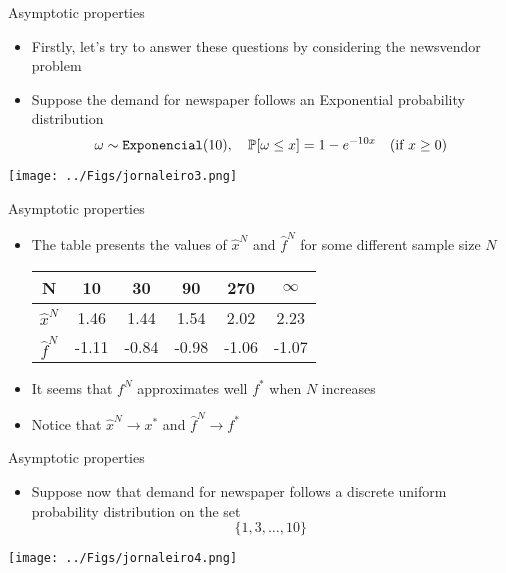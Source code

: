  
 
\begin{frame}{Asymptotic properties}
\begin{itemize}
\item Firstly, let's try to answer these questions by considering the newsvendor problem
\pula

\item Suppose the demand for newspaper follows an Exponential probability distribution
\[
\omega \sim {\tt Exponencial}(10),
\quad \mathbb{P}[\omega \leq x]= 1 - e^{-10x}\quad \mbox{(if $x\geq 0$)}
\]
\end{itemize}
\begin{center}
\texttt{[image: ../Figs/jornaleiro3.png]} {}
\end{center}
\end{frame} 





\begin{frame}{Asymptotic properties}

\begin{itemize}

\item The table presents the values of $\hat x^N$ and $\hat f^N$ for some different sample size $N$

\begin{center}
\begin{tabular}{|c|c|c|c|c|c|}
\hline 
N & 10 & 30 & 90 & 270 & $\infty$ \\ 
\hline 
$\hat x^N$ & 1.46 & 1.44 & 1.54 & 2.02 & 2.23 \\ 
\hline 
$\hat f^N$ & -1.11 & -0.84 & -0.98 & -1.06 & -1.07 \\ 
\hline 
\end{tabular} 
\end{center}
\item It seems that $f^N$ approximates well $f^*$ when $N$ increases
\pula

\item Notice that $\hat x^N \to x^*$ and $\hat f^N \to f^*$
\end{itemize}
 \end{frame} 
 
 

\begin{frame}{Asymptotic properties}

\begin{itemize}
\item Suppose now that demand for newspaper follows a discrete uniform probability distribution on the set
\[
\{1,3,\ldots, 10\}\,
\]
\end{itemize}
\begin{center}
\texttt{[image: ../Figs/jornaleiro4.png]} {}
\end{center}
\end{frame} 
 
